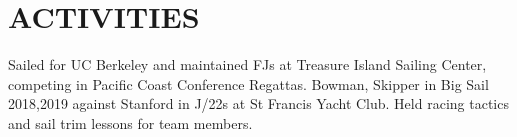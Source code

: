 \documentclass[10pt]{article}
\begin{document}
\section*{ACTIVITIES}

        {Sailed for UC Berkeley and maintained FJs at Treasure Island Sailing Center, competing in Pacific Coast Conference Regattas. 
          Bowman, Skipper in Big Sail 2018,2019 against Stanford in J/22s at St Francis Yacht Club. 
          Held racing tactics and sail trim lessons for team members.}

 
\end{document}
